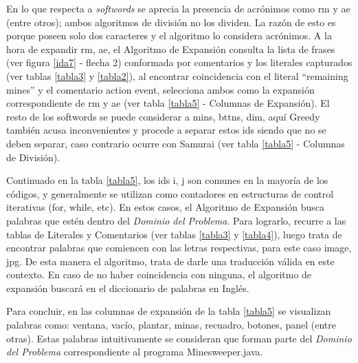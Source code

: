 En lo que respecta a \textit{softwords} se aprecia la presencia de acrónimos como \textsf{rm} y \textsf{ae} (entre otros); ambos algoritmos de división no los dividen. La razón de esto es porque  poseen solo dos caracteres y el algoritmo lo considera acrónimos.
 A la hora de expandir \textsf{rm}, \textsf{ae}, el Algoritmo de Expansión consulta la lista de frases (ver figura \ref{ida7} - flecha 2) conformada por comentarios y los literales capturados (ver tablas \ref{tabla3} y \ref{tabla2}), al encontrar coincidencia con el literal \textsf{“remaining mines”} y el comentario \textsf{action event}, selecciona ambos como la expansión correspondiente de \textsf{rm} y \textsf{ae} (ver tabla \ref{tabla5} - Columnas de Expansión).
El resto de los softwords se puede considerar a \textsf{mins}, \textsf{bttns}, \textsf{dim}, aquí Greedy también acusa inconvenientes y procede a separar estos ids siendo que no se deben separar, caso contrario ocurre con Samurai (ver tabla \ref{tabla5} - Columnas de División). %

Continuado en la tabla \ref{tabla5}, los ids \textsf{i}, \textsf{j} son comunes en la mayoría de los códigos, y generalmente se utilizan como contadores en estructuras de control iterativas (\textsf{for}, \textsf{while}, etc). En estos casos, el Algoritmo de Expansión busca palabras que estén dentro del \textit{Dominio del Problema}. Para lograrlo, recurre a las tablas de Literales y Comentarios (ver tablas \ref{tabla3} y \ref{tabla4}), luego trata de encontrar palabras que comiencen con las letras respectivas, para este caso \textsf{image}, \textsf{jpg}. De esta manera el algoritmo, trata de darle una traducción válida en este contexto. En caso de no haber coincidencia con ninguna, el algoritmo de expansión buscará en el diccionario de palabras en Inglés.

Para concluir, en las columnas de expansión de la tabla \ref{tabla5} se visualizan palabras como: ventana, vacío, plantar, minas, recuadro, botones, panel (entre otras). Estas palabras intuitivamente se consideran que forman parte del \textit{Dominio del Problema} correspondiente al programa Minesweeper.java.


